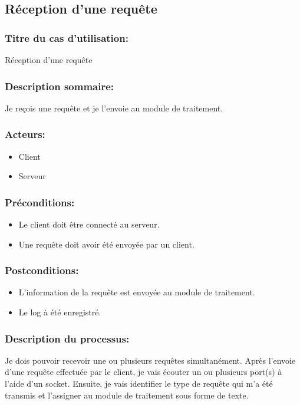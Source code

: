 \documentclass{scrreprt}
\begin{document}
\subsection{Réception d'une requête}
\subsubsection{Titre du cas d'utilisation:} Réception d'une requête
\subsubsection{Description sommaire:} Je reçois une requête et je l'envoie au module de traitement.
\subsubsection{Acteurs:}
\begin{itemize}
    \item Client
    \item Serveur
\end{itemize}
\subsubsection{Préconditions:}
\begin{itemize}
	\item Le client doit être connecté au serveur.
    \item Une requête doit avoir été envoyée par un client.
\end{itemize} 
\subsubsection{Postconditions:}
\begin{itemize}
    \item  L'information de la requête est envoyée au module de traitement.
    \item  Le log à été enregistré.
\end{itemize} 
\subsubsection{Description du processus:}
Je dois pouvoir recevoir une ou plusieurs requêtes simultanément. Après l'envoie d'une requête effectuée par le client, je vais écouter un ou plusieurs port(s) à l'aide d'un socket. Ensuite, je vais identifier le type de requête qui m'a été transmis et l'assigner au module de traitement sous forme de texte.
\end{document}
